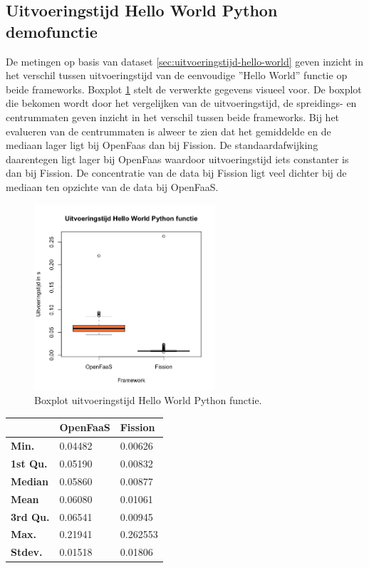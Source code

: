\subsection{Uitvoeringstijd Hello World Python demofunctie}
De metingen op basis van dataset \ref{sec:uitvoeringstijd-hello-world} geven inzicht in het verschil tussen uitvoeringstijd van de eenvoudige ''Hello World'' functie op beide frameworks. Boxplot \ref{fig:boxplot-hello-functie} stelt de verwerkte gegevens visueel voor.
De boxplot die bekomen wordt door het vergelijken van de uitvoeringstijd, de spreidings- en centrummaten geven inzicht in het verschil tussen beide frameworks. Bij het evalueren van de centrummaten is alweer te zien dat het gemiddelde en de mediaan lager ligt bij OpenFaas dan bij Fission. De standaardafwijking daarentegen ligt lager bij OpenFaas waardoor uitvoeringstijd iets constanter is dan bij Fission. De concentratie van de data bij Fission ligt veel dichter bij de mediaan ten opzichte van de data bij OpenFaaS.
\begin{figure}
    \centering
    \includegraphics[width=0.6\textwidth]{img/boxplot-uitvoeringstijd-hellofunctie.png}
    \caption{Boxplot uitvoeringstijd Hello World Python functie.}
    \label{fig:boxplot-hello-functie}
\end{figure}

\begin{tabular}{@{}lll@{}}
    \toprule
    & \textbf{OpenFaaS} & \textbf{Fission} \\ \midrule
    \textbf{Min.} & 0.04482 & 0.00626 \\
    \textbf{1st Qu.} & 0.05190 & 0.00832 \\
    \textbf{Median} & 0.05860 & 0.00877 \\
    \textbf{Mean} & 0.06080 & 0.01061 \\
    \textbf{3rd Qu.} & 0.06541 & 0.00945 \\
    \textbf{Max.} & 0.21941 & 0.262553\\
    \textbf{Stdev.} & 0.01518 & 0.01806 \\ \bottomrule
\end{tabular}


